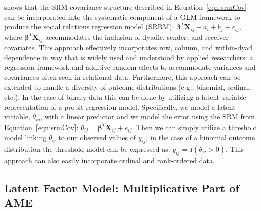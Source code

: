 \documentclass[12pt,onesided,pdflatex]{amsart}
\begin{document}
\citet{hoff:2005} shows that the SRM covariance structure described in Equation~\ref{eqn:srmCov} can be incorporated into the systematic component of a GLM framework to produce the social relations regression model (SRRM): $\bm\beta^{T} \mathbf{X}_{ij} + a_{i} + b_{j} + \epsilon_{ij}$, where $ \bm\beta^{T} \mathbf{X}_{ij}$ accommodates the inclusion of dyadic, sender, and receiver covariates. This approach  effectively incorporates row, column, and within-dyad dependence in way that is widely used and understood by applied researchers: a regression framework and additive random effects to accommodate variances and covariances often seen in relational data. Furthermore, this approach can be extended to handle a diversity of outcome distributions (e.g., binomial, ordinal, etc.). In the case of binary data this can be done by utilizing a latent variable representation of a probit regression model. Specifically, we model a latent variable, $\theta_{ij}$, with a linear predictor and we model the error using the SRM from Equation~\ref{eqn:srmCov}: $\theta_{ij} = \bm\beta^{T} \mathbf{X}_{ij} + e_{ij}$. Then we can simply utilize a threshold model linking $\theta_{ij}$ to our observed values of $y_{ij}$, in the case of a binomial outcome distribution the threshold model can be expressed as: $y_{ij} = I(\theta_{ij}>0)$.  This approach can also easily incorporate ordinal and rank-ordered data.


\subsection{Latent Factor Model: Multiplicative Part of AME}
\end{document}
